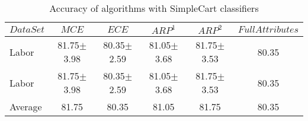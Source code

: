 \documentclass[final,5p,times]{elsarticle}
\begin{document}
\begin{table*}[htbp]
\centering
\caption{Accuracy of  algorithms with SimpleCart classifiers}
\label{tab:reduction:accresults:simplecart}
\begin{tabular}{lccccc}
	\toprule
	$DataSet$ &
	$MCE$ &
	$ECE$ &
	$ARP^1$ &
	$ARP^2$ &
	$FullAttributes$ \\
	\midrule
	Labor	&	81.75$\pm$3.98	&	80.35$\pm$2.59	&	81.05$\pm$3.68	&	81.75$\pm$3.53	&	80.35	\\
	Labor	&	81.75$\pm$3.98	&	80.35$\pm$2.59	&	81.05$\pm$3.68	&	81.75$\pm$3.53	&	80.35	\\
	\midrule
	Average	&	81.75	&	80.35	&	81.05	&	81.75	&	80.35	\\
	\bottomrule
	\end{tabular}
\end{table*}
\end{document}
